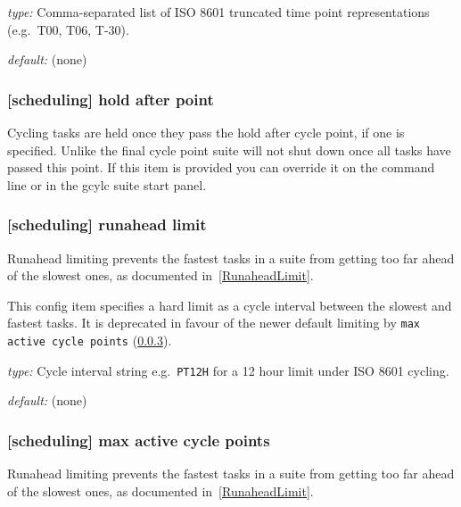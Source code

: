 \begin{myitemize}
    \item {\em type:} Comma-separated list of ISO 8601 truncated time point
        representations (e.g.\  T00, T06, T-30).
    \item {\em default:} (none)
\end{myitemize}

\subsubsection[hold after point]{[scheduling] \textrightarrow hold after point}

Cycling tasks are held once they pass the hold after cycle point, if one is
specified. Unlike the final cycle point suite will not shut down once all tasks
have passed this point. If this item is provided you can override it on the
command line or in the gcylc suite start panel.

\subsubsection[runahead limit]{[scheduling] \textrightarrow runahead limit}
\label{runahead limit}

Runahead limiting prevents the fastest tasks in a suite from getting too far
ahead of the slowest ones, as documented in~\ref{RunaheadLimit}.

This config item specifies a hard limit as a cycle interval between the
slowest and fastest tasks. It is deprecated in favour of the newer default
limiting by \lstinline=max active cycle points= (\ref{max active cycle points}).

\begin{myitemize}
    \item {\em type:} Cycle interval string e.g.\  \lstinline=PT12H=
    for a 12 hour limit under ISO 8601 cycling.
    \item {\em default:} (none)
\end{myitemize}

\subsubsection[max active cycle points]{[scheduling] \textrightarrow
 max active cycle points}
\label{max active cycle points}

Runahead limiting prevents the fastest tasks in a suite from getting too far
ahead of the slowest ones, as documented in~\ref{RunaheadLimit}.

